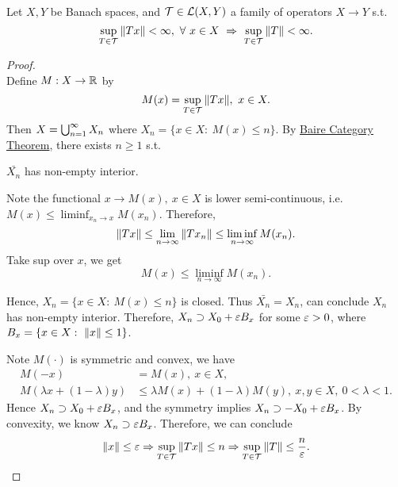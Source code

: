 \vspace{3pt}
\begin{proposition}\ \\
Let $X,Y$ be Banach spaces, and $\mathcal{T} \in \mathcal{L}(X,Y)$ a family of operators $X \to Y$ s.t.
\begin{equation*}
    \sup_{T \in \mathcal{T}} \norm{Tx} < \infty,\ \forall\ x \in X \ \Rightarrow\ \sup_{T \in \mathcal{T}} \norm{T} < \infty.
\end{equation*}
\end{proposition}
\begin{proof}\ \\
Define $M: X \to \mathbb{R}$ by
\begin{equation*}
    M(x) = \sup_{T \in \mathcal{T}} \norm{Tx},\ x \in X.
\end{equation*}
Then $X = \bigcup_{n=1}^{\infty} X_n$ where $X_n = \{x \in X:\ M(x) \leq n\}$. By \hyperref[BCT]{Baire Category Theorem}, there exists $n \geq 1$ s.t.
\begin{center}
    $\bar{X_n}$ has non-empty interior.
\end{center}
Note the functional $x \to M(x),\ x \in X$ is lower semi-continuous, i.e. $M(x) \leq \liminf_{x_n \to x} M(x_n)$. Therefore,
\begin{equation*}
    \norm{Tx} \leq \lim_{n \to \infty} \norm{Tx_n} \leq \liminf_{n\to \infty}M(x_n).
\end{equation*}
Take sup over $x$, we get
\begin{equation*}
    M(x) \leq \liminf_{n \to \infty} M(x_n).
\end{equation*}

\np Hence, $X_n = \{x \in X:\ M(x) \leq n\}$ is closed. Thus $\bar{X_n} = X_n$, can conclude $X_n$ has non-empty interior. Therefore, $X_n \supset X_0 + \varepsilon B_x$ for some $\varepsilon > 0$, where $B_x = \{x \in X:\ \norm{x} \leq 1\}$. 

\np Note $M(\cdot)$ is symmetric and convex, we have
\begin{align*}
    M(-x) &= M(x),\ x \in X,\\
    M(\lambda x + (1-\lambda)y) &\leq \lambda M(x) + (1 - \lambda) M(y),\ x,y \in X,\ 0 < \lambda < 1.
\end{align*}
Hence $X_n \supset X_0 + \varepsilon B_x$, and the symmetry implies $X_n \supset - X_0 + \varepsilon B_x$. By convexity, we know $X_n \supset \varepsilon B_x$. Therefore, we can conclude 
\begin{equation*}
    \norm{x} \leq \varepsilon \Rightarrow \sup_{T \in \mathcal{T}} \norm{Tx} \leq n \Rightarrow \sup_{T \in \mathcal{T}} \norm{T} \leq \frac{n}{\varepsilon}.
\end{equation*}
\end{proof}


